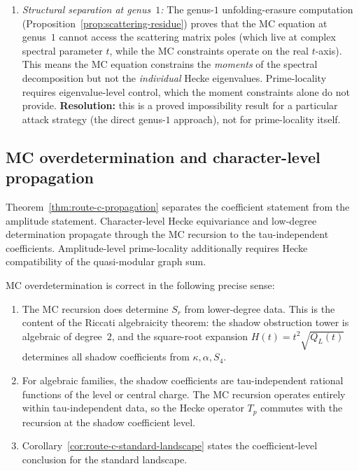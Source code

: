 \begin{theorem}
\begin{enumerate}[label=\textup{(\alph*)}]
\item \emph{Structural separation at genus~$1$:}
 The genus-$1$ unfolding-erasure computation
 \textup{(}Proposition~\textup{\ref{prop:scattering-residue}}\textup{)}
 proves that
 the MC equation at genus~$1$ cannot access the scattering
 matrix poles \textup{(}which live at complex spectral
 parameter $t$, while the MC constraints operate on the real
 $t$-axis\textup{)}. This means the MC equation constrains
 the \emph{moments} of the spectral decomposition but not the
 \emph{individual} Hecke eigenvalues. Prime-locality requires
 eigenvalue-level control, which the moment constraints alone
 do not provide.
 \textbf{Resolution:} this is a proved impossibility result for
 a particular attack strategy \textup{(}the direct genus-$1$
 approach\textup{)}, not for prime-locality itself.
\end{enumerate}
\end{theorem}

\subsection{MC overdetermination and character-level propagation}%
\label{subsec:route-c-overdetermination}%

Theorem~\ref{thm:route-c-propagation} separates the
coefficient statement from the amplitude statement. Character-level
Hecke equivariance and low-degree determination propagate through the
MC recursion to the tau-independent coefficients. Amplitude-level
prime-locality additionally requires Hecke compatibility of the
quasi-modular graph sum.

\begin{remark}%
\label{rem:route-c-success}%
MC overdetermination is correct in the following precise sense:
\begin{enumerate}[label=\textup{(\roman*)}]
\item The MC recursion does determine $S_r$ from lower-degree
 data. This is the content of the Riccati algebraicity
 theorem: the shadow obstruction tower is algebraic of degree~$2$,
 and the square-root expansion
 $H(t) = t^2\sqrt{Q_L(t)}$ determines all shadow coefficients
 from $\kappa, \alpha, S_4$.

\item For algebraic families, the shadow coefficients are
 tau-independent rational functions of the level or central
 charge. The MC recursion operates entirely within
 tau-independent data, so the Hecke operator $T_p$ commutes
 with the recursion at the shadow coefficient level.

 \item Corollary~\textup{\ref{cor:route-c-standard-landscape}}
 states the coefficient-level conclusion for the standard landscape.
\end{enumerate}
\end{remark}

